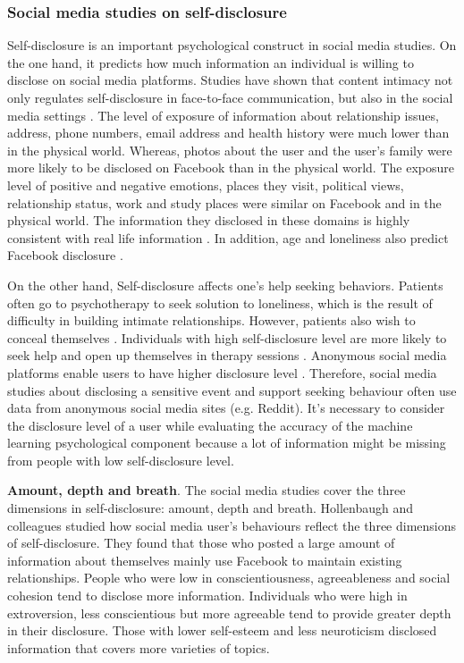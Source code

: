 \subsubsection{Social media studies on self-disclosure}
Self-disclosure is an important psychological construct in social media studies. On the one hand, it predicts how much information an individual is willing to disclose on social media platforms. Studies have shown that content intimacy not only regulates self-disclosure in face-to-face communication, but also in the social media settings \cite{ma_anonymity_2016}. The level of exposure of information about relationship issues, address, phone numbers, email address and health history were much lower than in the physical world. Whereas, photos about the user and the user's family were more likely to be disclosed on Facebook than in the physical world. The exposure level of positive and negative emotions, places they visit, political views, relationship status, work and study places were similar on Facebook and in the physical world. The information they disclosed in these domains is highly consistent with real life information \cite{villela2015contrasting}. In addition, age and loneliness also predict Facebook disclosure \cite{malik2016uses}. 


On the other hand, Self-disclosure affects one's help seeking behaviors. Patients often go to psychotherapy to seek solution to loneliness, which is the result of difficulty in building intimate relationships. However, patients also wish to conceal themselves \cite{fisher1990shared, stricker1990self}.  Individuals with high self-disclosure level are more likely to seek help and open up themselves in therapy sessions \cite{hinson1993willingness}. Anonymous social media platforms enable users to have higher disclosure level \cite{andalibi_announcing_2018}. Therefore, social media studies about disclosing a sensitive event and support seeking behaviour often use data from anonymous social media sites (e.g. Reddit). It's necessary to consider the disclosure level of a user while evaluating the accuracy of the machine learning psychological component because a lot of information might be missing from people with low self-disclosure level.


\textbf{Amount, depth and breath}. The social media studies cover the three dimensions in self-disclosure: amount, depth and breath. Hollenbaugh and colleagues \citet{hollenbaugh_facebook_2014} studied how social media user's behaviours reflect the three dimensions of self-disclosure. They found that those who posted a large amount of information about themselves mainly use Facebook to maintain existing relationships. People who were low in conscientiousness, agreeableness and social cohesion tend to disclose more information. Individuals who were high in extroversion, less conscientious but more agreeable tend to provide greater depth in their disclosure. Those with lower self-esteem and less neuroticism disclosed information that covers more varieties of topics. 

